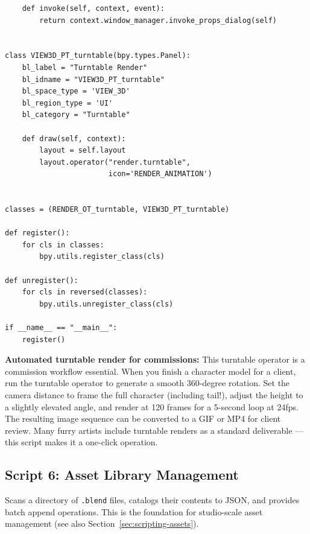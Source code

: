 \begin{lstlisting}
    def invoke(self, context, event):
        return context.window_manager.invoke_props_dialog(self)


class VIEW3D_PT_turntable(bpy.types.Panel):
    bl_label = "Turntable Render"
    bl_idname = "VIEW3D_PT_turntable"
    bl_space_type = 'VIEW_3D'
    bl_region_type = 'UI'
    bl_category = "Turntable"

    def draw(self, context):
        layout = self.layout
        layout.operator("render.turntable",
                        icon='RENDER_ANIMATION')


classes = (RENDER_OT_turntable, VIEW3D_PT_turntable)

def register():
    for cls in classes:
        bpy.utils.register_class(cls)

def unregister():
    for cls in reversed(classes):
        bpy.utils.unregister_class(cls)

if __name__ == "__main__":
    register()
\end{lstlisting}

\begin{furrybox}
\textbf{Automated turntable render for commissions:} This turntable operator is a commission workflow essential. When you finish a character model for a client, run the turntable operator to generate a smooth 360-degree rotation. Set the camera distance to frame the full character (including tail!), adjust the height to a slightly elevated angle, and render at 120 frames for a 5-second loop at 24fps. The resulting image sequence can be converted to a GIF or MP4 for client review. Many furry artists include turntable renders as a standard deliverable --- this script makes it a one-click operation.
\end{furrybox}

\subsection{Script 6: Asset Library Management}

Scans a directory of \texttt{.blend} files, catalogs their contents to JSON, and provides batch append operations. This is the foundation for studio-scale asset management (see also Section~\ref{sec:scripting-assets}).

